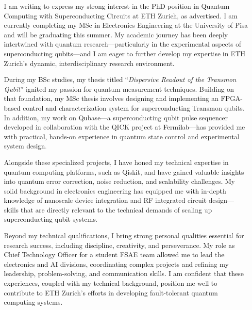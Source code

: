 \documentclass[12pt,stdletter,dateno]{newlfm}
\begin{document}
    \begin{newlfm}
        
        I am writing to express my strong interest in the PhD position in Quantum Computing with Superconducting Circuits at ETH Zurich, as advertised. I am currently completing my MSc in Electronics Engineering at the University of Pisa and will be graduating this summer. My academic journey has been deeply intertwined with quantum research—particularly in the experimental aspects of superconducting qubits—and I am eager to further develop my expertise in ETH Zurich’s dynamic, interdisciplinary research environment.
        
        During my BSc studies, my thesis titled “\textit{Dispersive Readout of the Transmon Qubit}” ignited my passion for quantum measurement techniques. Building on that foundation, my MSc thesis involves designing and implementing an FPGA-based control and characterization system for superconducting Transmon qubits. In addition, my work on Qubase—a superconducting qubit pulse sequencer developed in collaboration with the QICK project at Fermilab—has provided me with practical, hands-on experience in quantum state control and experimental system design.
        
        Alongside these specialized projects, I have honed my technical expertise in quantum computing platforms, such as Qiskit, and have gained valuable insights into quantum error correction, noise reduction, and scalability challenges. My solid background in electronics engineering has equipped me with in-depth knowledge of nanoscale device integration and RF integrated circuit design—skills that are directly relevant to the technical demands of scaling up superconducting qubit systems.
        
        Beyond my technical qualifications, I bring strong personal qualities essential for research success, including discipline, creativity, and perseverance. My role as Chief Technology Officer for a student FSAE team allowed me to lead the electronics and AI divisions, coordinating complex projects and refining my leadership, problem-solving, and communication skills. I am confident that these experiences, coupled with my technical background, position me well to contribute to ETH Zurich’s efforts in developing fault-tolerant quantum computing systems.
        

\end{newlfm}
\end{document}
